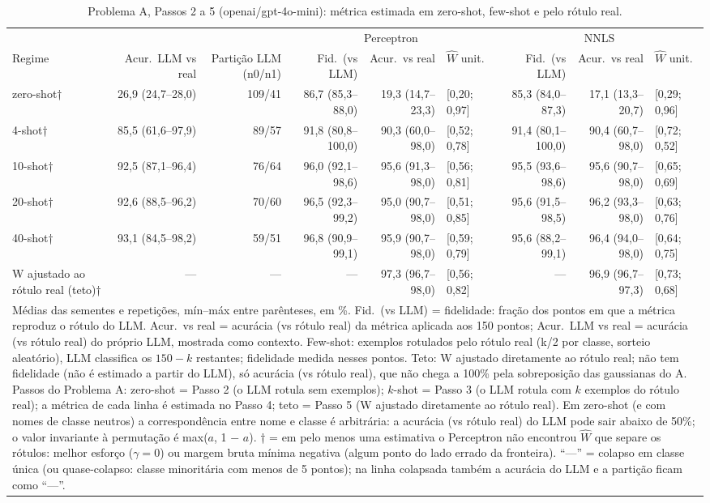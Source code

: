\begin{table}[htbp]
\centering
\small
\caption{Problema A, Passos 2 a 5 (openai/gpt-4o-mini): métrica estimada em zero-shot, few-shot e pelo rótulo real.}
\label{tab:A_passos_2_a_5_gpt4mini}
\begin{tabular}{lrrrrlrrl}
\toprule
 &  &  & \multicolumn{3}{c}{Perceptron} & \multicolumn{3}{c}{NNLS} \\ \cmidrule(lr){4-6} \cmidrule(lr){7-9}
Regime & Acur.\ LLM vs real & Partição LLM (n0/n1) & Fid.\ (vs LLM) & Acur.\ vs real & $\hat{W}$ unit. & Fid.\ (vs LLM) & Acur.\ vs real & $\hat{W}$ unit. \\
\midrule
zero-shot† & 26,9 (24,7–28,0) & 109/41 & 86,7 (85,3–88,0) & 19,3 (14,7–23,3) & [0,20; 0,97] & 85,3 (84,0–87,3) & 17,1 (13,3–20,7) & [0,29; 0,96] \\
4-shot† & 85,5 (61,6–97,9) & 89/57 & 91,8 (80,8–100,0) & 90,3 (60,0–98,0) & [0,52; 0,78] & 91,4 (80,1–100,0) & 90,4 (60,7–98,0) & [0,72; 0,52] \\
10-shot† & 92,5 (87,1–96,4) & 76/64 & 96,0 (92,1–98,6) & 95,6 (91,3–98,0) & [0,56; 0,81] & 95,5 (93,6–98,6) & 95,6 (90,7–98,0) & [0,65; 0,69] \\
20-shot† & 92,6 (88,5–96,2) & 70/60 & 96,5 (92,3–99,2) & 95,0 (90,7–98,0) & [0,51; 0,85] & 95,6 (91,5–98,5) & 96,2 (93,3–98,0) & [0,63; 0,76] \\
40-shot† & 93,1 (84,5–98,2) & 59/51 & 96,8 (90,9–99,1) & 95,9 (90,7–98,0) & [0,59; 0,79] & 95,6 (88,2–99,1) & 96,4 (94,0–98,0) & [0,64; 0,75] \\
\midrule
W ajustado ao rótulo real (teto)† & — & — & — & 97,3 (96,7–98,0) & [0,56; 0,82] & — & 96,9 (96,7–97,3) & [0,73; 0,68] \\
\bottomrule
\multicolumn{9}{p{0.95\linewidth}}{\footnotesize Médias das sementes e repetições, mín–máx entre parênteses, em \%. Fid.\ (vs LLM) = fidelidade: fração dos pontos em que a métrica reproduz o rótulo do LLM. Acur.\ vs real = acurácia (vs rótulo real) da métrica aplicada aos 150 pontos; Acur.\ LLM vs real = acurácia (vs rótulo real) do próprio LLM, mostrada como contexto. Few-shot: exemplos rotulados pelo rótulo real (k/2 por classe, sorteio aleatório), LLM classifica os $150-k$ restantes; fidelidade medida nesses pontos. Teto: W ajustado diretamente ao rótulo real; não tem fidelidade (não é estimado a partir do LLM), só acurácia (vs rótulo real), que não chega a 100\% pela sobreposição das gaussianas do A. Passos do Problema A: zero-shot = Passo 2 (o LLM rotula sem exemplos); $k$-shot = Passo 3 (o LLM rotula com $k$ exemplos do rótulo real); a métrica de cada linha é estimada no Passo 4; teto = Passo 5 (W ajustado diretamente ao rótulo real). Em zero-shot (e com nomes de classe neutros) a correspondência entre nome e classe é arbitrária: a acurácia (vs rótulo real) do LLM pode sair abaixo de 50\%; o valor invariante à permutação é max($a$, 1 $-$ $a$). † = em pelo menos uma estimativa o Perceptron não encontrou $\hat{W}$ que separe os rótulos: melhor esforço ($\gamma = 0$) ou margem bruta mínima negativa (algum ponto do lado errado da fronteira). ``—'' = colapso em classe única (ou quase-colapso: classe minoritária com menos de 5 pontos); na linha colapsada também a acurácia do LLM e a partição ficam como ``—''.} \\

\end{tabular}
\end{table}
